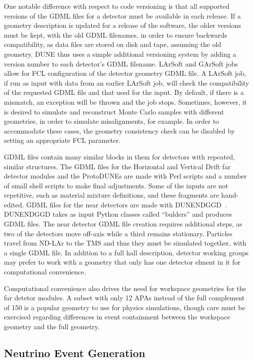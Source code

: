 \documentclass[../main-v1.tex]{subfiles}
\begin{document}
One notable difference with respect to code versioning is that all supported versions of the GDML files for a detector must be available in each release.  If a geometry description is updated for a release of the software, the older versions must be kept, with the old GDML filenames, in order to ensure backwards compatibility, as data files are stored on disk and tape, assuming the old geometry.  DUNE thus uses a simple additional versioning system by adding a version number to each detector's GDML filename.  LArSoft and GArSoft jobs allow for FCL configuration of the detector geometry GDML file.  A LArSoft job, if run as input with data from an earlier LArSoft job, will check the compatibility of the requested GDML file and that used for the input.  By default, if there is a mismatch, an exception will be thrown and the job stops.  Sometimes, however, it is desired to simulate and reconstruct Monte Carlo samples with different geometries, in order to simulate misalignments, for example.  In order to accommodate these cases, the geometry consistency check can be disabled by setting an appropriate FCL parameter.

GDML files contain many similar blocks in them for detectors with repeated, similar structures.  The GDML files for the Horizontal and Vertical Drift far detector modules and the ProtoDUNEs are made with Perl scripts and a number of small shell scripts to make final adjustments.  Some of the inputs are not repetitive, such as material mixture definitions, and these fragments are hand-edited.  GDML files for the near detectors are made with DUNENDGGD~\cite{ref:ggd}.  DUNENDGGD takes as input Python classes called ``bulders'' and produces GDML files.  The near detector GDML file creation requires additional steps, as two of the detectors move off-axis while a third remains stationary.  Particles travel from ND-LAr to the TMS and thus they must be simulated together, with a single GDML file.  In addition to a full hall description, detector working groups may prefer to work with a geometry that only has one detector elment in it for computational convenience.

Computational convenience also drives the need for workspace geometries for the far detetor modules.  A subset with only 12 APAs instead of the full complement of 150 is a popular geometry to use for physics simulations, though care must be exercised regarding differences in event containment between the workspace geometry and the full geometry.

\subsection{Neutrino Event Generation}
\end{document}
